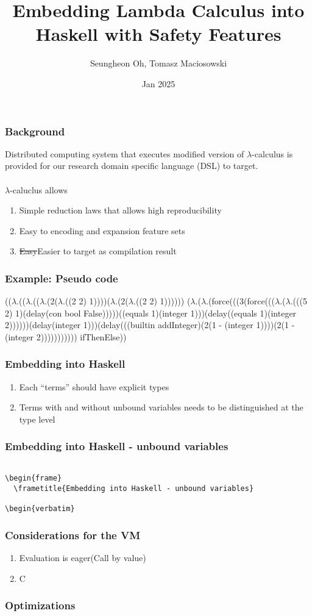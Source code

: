 \documentclass{beamer}
\title{Embedding Lambda Calculus into Haskell with Safety Features}
\author{Seungheon Oh, Tomasz Maciosowski}
\institute{MLabs}
\date{Jan 2025}
\begin{document}
\frame{\titlepage}

\begin{frame}
  \frametitle{Background}
  Distributed computing system that executes modified version of $\lambda$-calculus is provided for our research domain specific language (DSL) to target. \\~\\

  $\lambda$-caluclus allows
  \begin{enumerate}
  \item
    Simple reduction laws that allows high reproducibility
  \item
    Easy to encoding and expansion feature sets
  \item
    \sout{Easy}Easier to target as compilation result
  \end{enumerate}

\end{frame}

\begin{frame}[fragile]
  \frametitle{Example: Pseudo code}
  (($\lambda .$(($\lambda .$(($\lambda .$(2($\lambda .$((2 2) 1))))($\lambda .$(2($\lambda .$((2 2) 1))))))
  ($\lambda .$($\lambda .$(force(((3(force((($\lambda .$($\lambda .$(((5 2) 1)(delay(con bool False)))))((equals 1)(integer 1)))(delay((equals 1)(integer 2))))))(delay(integer 1)))(delay(((builtin addInteger)(2(1 - (integer 1))))(2(1 - (integer 2))))))))))) ifThenElse))
\end{frame}

\begin{frame}
  \frametitle{Embedding into Haskell}
  \begin{enumerate}
  \item
    Each ``terms'' should have explicit types
  \item
    Terms with and without unbound variables needs to be distinguished at the type level
  \end{enumerate}
\end{frame}

\begin{frame}
  \frametitle{Embedding into Haskell - unbound variables}

\begin{verbatim}

\begin{frame}
  \frametitle{Embedding into Haskell - unbound variables}

\begin{verbatim}

\end{verbatim}
\end{frame}

\begin{frame}
  \frametitle{Considerations for the VM}
  \begin{enumerate}
  \item
    Evaluation is eager(Call by value)
  \item
    C
  \end{enumerate}
\end{frame}

\begin{frame}
  \frametitle{Optimizations}
\end{frame}
\end{document}
